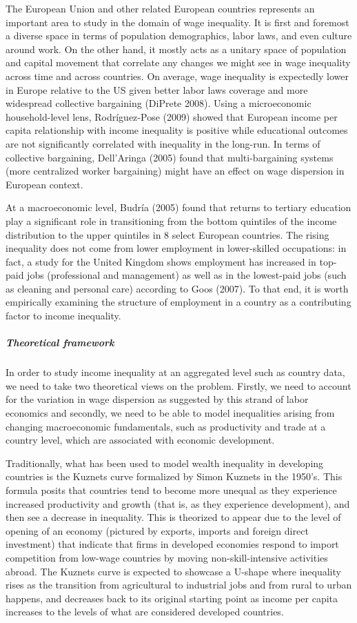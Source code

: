 \documentclass[
]{article}
\begin{document}
The European Union and other related European countries represents an
important area to study in the domain of wage inequality. It is first
and foremost a diverse space in terms of population demographics, labor
laws, and even culture around work. On the other hand, it mostly acts as
a unitary space of population and capital movement that correlate any
changes we might see in wage inequality across time and across
countries. On average, wage inequality is expectedly lower in Europe
relative to the US given better labor laws coverage and more widespread
collective bargaining (DiPrete 2008). Using a microeconomic
household-level lens, Rodríguez‐Pose (2009) showed that European income
per capita relationship with income inequality is positive while
educational outcomes are not significantly correlated with inequality in
the long-run. In terms of collective bargaining, Dell'Aringa (2005)
found that multi-bargaining systems (more centralized worker bargaining)
might have an effect on wage dispersion in European context.

At a macroeconomic level, Budría (2005) found that returns to tertiary
education play a significant role in transitioning from the bottom
quintiles of the income distribution to the upper quintiles in 8 select
European countries. The rising inequality does not come from lower
employment in lower-skilled occupations: in fact, a study for the United
Kingdom shows employment has increased in top-paid jobs (professional
and management) as well as in the lowest-paid jobs (such as cleaning and
personal care) according to Goos (2007). To that end, it is worth
empirically examining the structure of employment in a country as a
contributing factor to income inequality.

\hypertarget{theoretical-framework}{%
\subparagraph{Theoretical framework}\label{theoretical-framework}}

In order to study income inequality at an aggregated level such as
country data, we need to take two theoretical views on the problem.
Firstly, we need to account for the variation in wage dispersion as
suggested by this strand of labor economics and secondly, we need to be
able to model inequalities arising from changing macroeconomic
fundamentals, such as productivity and trade at a country level, which
are associated with economic development.

Traditionally, what has been used to model wealth inequality in
developing countries is the Kuznets curve formalized by Simon Kuznets in
the 1950's. This formula posits that countries tend to become more
unequal as they experience increased productivity and growth (that is,
as they experience development), and then see a decrease in inequality.
This is theorized to appear due to the level of opening of an economy
(pictured by exports, imports and foreign direct investment) that
indicate that firms in developed economies respond to import competition
from low-wage countries by moving non-skill-intensive activities abroad.
The Kuznets curve is expected to showcase a U-shape where inequality
rises as the transition from agricultural to industrial jobs and from
rural to urban happens, and decreases back to its original starting
point as income per capita increases to the levels of what are
considered developed countries.
\end{document}
